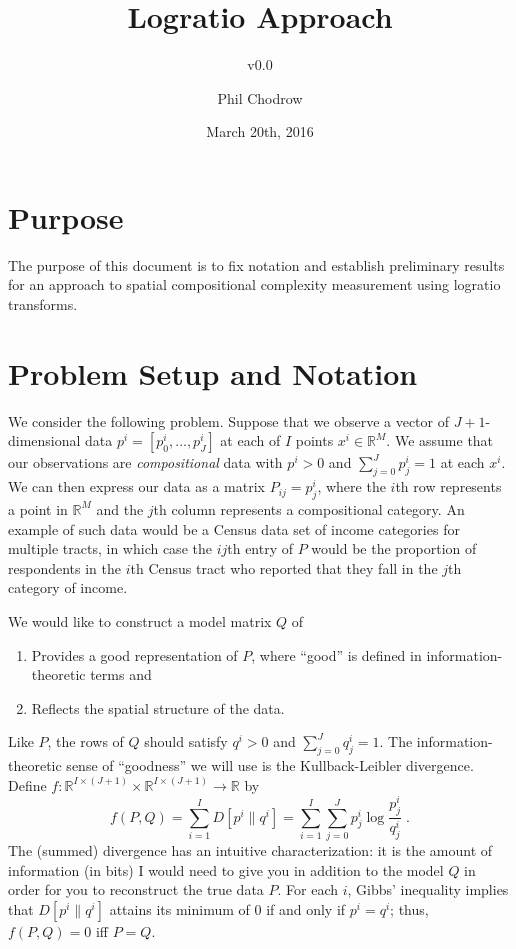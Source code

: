 \documentclass[english]{scrartcl}
\title{Logratio Approach}
\subtitle{v0.0}
\author{Phil Chodrow}
\date{March 20th, 2016}
\newcommand\R[0]{\mathbb{R}}
\begin{document}
\maketitle

\section{Purpose}
	The purpose of this document is to fix notation and establish preliminary results for an approach to spatial compositional complexity measurement using logratio transforms. 

\section{Problem Setup and Notation}
	We consider the following problem. Suppose that we observe a vector of $J+1$-dimensional  data $p^i = [p^i_0,\ldots,p^i_J]$ at each of $I$ points $x^i \in \R^M$. We assume that our observations are \textit{compositional} data with $p^i>0$ and $\sum_{j=0}^J p^i_j =1$ at each $x^i$. We can then express our data as a matrix $P_{ij} = p^i_j$, where the $i$th row represents a point in $\R^M$ and the $j$th column represents a compositional category. An example of such data would be a Census data set of income categories for multiple tracts, in which case the $ij$th entry of $P$ would be the proportion of respondents in the $i$th Census tract who reported that they fall in the $j$th category of income. 

	We would like to construct a model matrix $Q$ of  
	\begin{enumerate}
		\item Provides a good representation of $P$, where ``good'' is defined in information-theoretic terms and 
		\item Reflects the spatial structure of the data. 
	\end{enumerate}
	Like $P$, the rows of $Q$ should satisfy $q^i > 0$ and $\sum_{j = 0}^J q^i_j = 1$. 
	The information-theoretic sense of ``goodness'' we will use is the Kullback-Leibler divergence. Define $f:\R^{I \times (J+1)} \times \R^{I \times (J+1)} \rightarrow \R$ by
	\begin{equation}
		f(P,Q) = \sum_{i=1}^I D[p^i\|q^i] = \sum_{i = 1}^I \sum_{j = 0}^J p^i_j \log \frac{p^i_j}{q^i_j}\;. \label{objective}
	\end{equation}
	The (summed) divergence has an intuitive characterization: it is the amount of information (in bits) I would need to give you in addition to the model $Q$ in order for you to reconstruct the true data $P$. For each $i$, Gibbs' inequality implies that $D[p^i\|q^i]$ attains its minimum of $0$ if and only if $p^i = q^i$; thus, $f(P,Q) = 0$ iff $P = Q$. 
\end{document}
